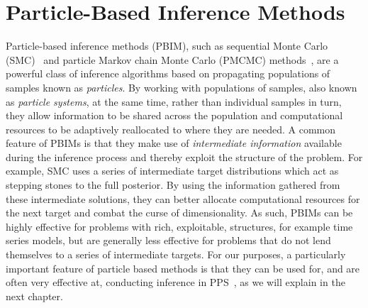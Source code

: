 
\chapter{Particle-Based Inference Methods}
\label{chp:part}

Particle-based inference methods (PBIM), such as sequential Monte Carlo (SMC)~\citep{gordon1993novel,doucet2001introduction} and 
particle Markov chain Monte Carlo (PMCMC) methods~\citep{andrieu2009pseudo,rainforth2016interacting},
are a powerful class of inference algorithms based on propagating populations of samples
known as \emph{particles}.  By working with populations of samples, also known as \emph{particle systems},
 at the same time, rather than individual
samples in turn, they allow information to be shared across the population and computational
resources to be adaptively reallocated to where they are needed.  A common feature of PBIMs is
that they make use of \emph{intermediate information} available during the inference process and thereby
exploit the structure of the problem.  For example, SMC uses a series of intermediate target distributions
which act as stepping stones to the full posterior.  By using the information gathered from these intermediate
solutions, they can better allocate computational resources for the next target and combat the curse of
dimensionality.  As such, PBIMs can be highly effective for problems with rich, exploitable, structures, 
for example time series models, but are generally less effective for problems that do not lend themselves
to a series of intermediate targets.  For our purposes, a particularly important feature of particle based
methods is that they can be used for, and are often very effective at, conducting inference in PPS~\citep{wood2014new}, as we will
explain in the next chapter.





%
%
